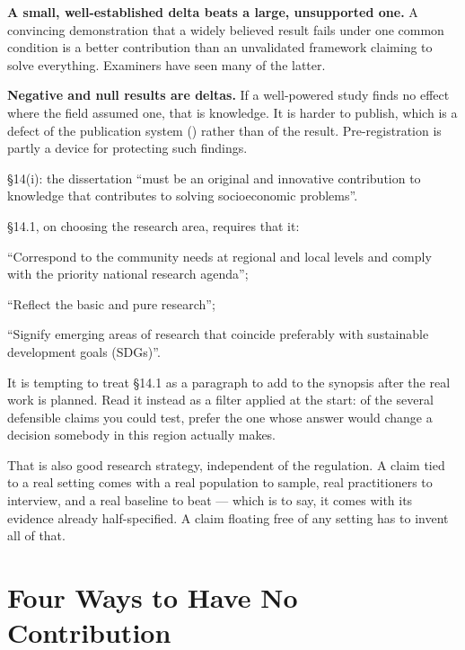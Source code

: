 \textbf{A small, well-established delta beats a large, unsupported one.} A
convincing demonstration that a widely believed result fails under one common
condition is a better contribution than an unvalidated framework claiming to
solve everything. Examiners have seen many of the latter.

\textbf{Negative and null results are deltas.} If a well-powered study finds no
effect where the field assumed one, that is knowledge. It is harder to publish,
which is a defect of the publication system () rather than of the
result. Pre-registration is partly a device for protecting such findings.

\begin{regbox}
\S14(i): the dissertation ``must be an original and innovative contribution to
knowledge that contributes to solving socioeconomic problems''.

\medskip
\S14.1, on choosing the research area, requires that it:
\begin{tight}
  \item ``Correspond to the community needs at regional and local levels and
    comply with the priority national research agenda'';
  \item ``Reflect the basic and pure research'';
  \item ``Signify emerging areas of research that coincide preferably with
    sustainable development goals (SDGs)''.
\end{tight}
\end{regbox}

\begin{conceptbox}
It is tempting to treat \S14.1 as a paragraph to add to the synopsis after the
real work is planned. Read it instead as a filter applied at the start: of the
several defensible claims you could test, prefer the one whose answer would
change a decision somebody in this region actually makes.

\medskip
That is also good research strategy, independent of the regulation. A claim
tied to a real setting comes with a real population to sample, real
practitioners to interview, and a real baseline to beat --- which is to say, it
comes with its evidence already half-specified. A claim floating free of any
setting has to invent all of that.
\end{conceptbox}

\section{Four Ways to Have No Contribution}

